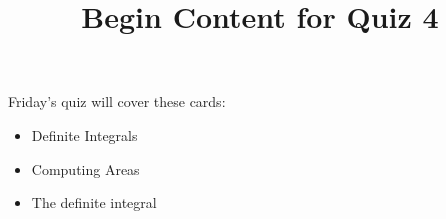 \documentclass{ximera}
\title{Begin Content for Quiz 4}
\begin{document}
\begin{abstract}
\end{abstract}

\maketitle

\begin{sectionOutcomes}

Friday's quiz will cover these cards:





\begin{itemize}
\item Definite Integrals
\item Computing Areas
\item The definite integral
\end{itemize}


\end{sectionOutcomes}
\end{document}
